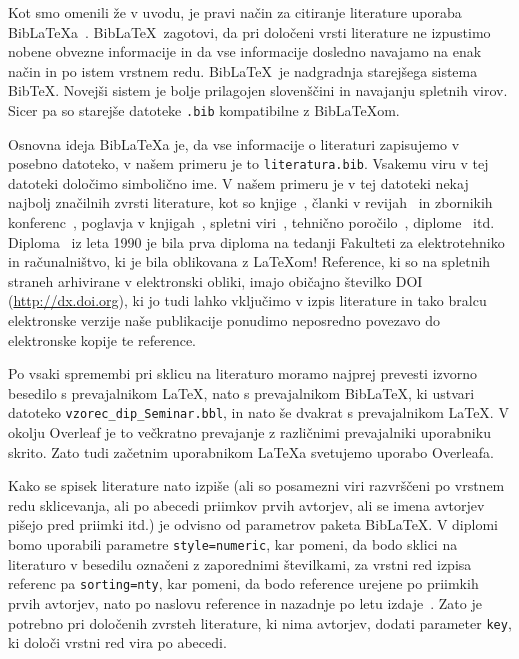 \documentclass[a4paper,12pt,openright]{book}
\newcommand{\BibLaTeX}{{\sc Bib}\LaTeX}
\newcommand{\BibTeX}{{\sc Bib}\TeX}
\begin{document}
    Kot smo omenili že v uvodu, je pravi način za citiranje literature uporaba \BibLaTeX{a}~\cite{biblatex}.
    \BibLaTeX\ zagotovi, da pri določeni vrsti literature ne izpustimo
    nobene obvezne informacije
    in da vse informacije dosledno navajamo na enak način in po istem vrstnem redu.
    \BibLaTeX\ je nadgradnja starejšega sistema \BibTeX. Novejši sistem je bolje prilagojen slovenščini in navajanju spletnih virov. Sicer pa so starejše datoteke \texttt{.bib} kompatibilne z \BibLaTeX om.

    Osnovna ideja \BibLaTeX{a} je, da vse informacije o literaturi zapisujemo v posebno datoteko, v našem primeru je to \texttt{literatura.bib}.
    Vsakemu viru v tej datoteki določimo simbolično ime.
    V našem primeru je v tej datoteki nekaj najbolj značilnih zvrsti literature, kot so knjige~\cite{lamport},
    članki v revijah~\cite{leonardo} in zbornikih konferenc~\cite{ciuha2010visualization},
    poglavja v knjigah~\cite{poglavje_springer},
    spletni viri~\cite{slovarji,video},
    tehnično poročilo~\cite{andersen2012kinect},
    diplome~\cite{diploma} itd.
    Diploma~\cite{diploma} iz leta 1990 je bila prva diploma na tedanji Fakulteti za elektrotehniko in računalništvo, ki je bila oblikovana z \LaTeX om!
    Reference, ki so na spletnih straneh arhivirane v elektronski obliki, imajo običajno  \v stevilko DOI (\url{http://dx.doi.org}), ki jo tudi lahko vključimo v izpis literature in tako bralcu elektronske verzije naše publikacije ponudimo neposredno povezavo do elektronske kopije te reference.

    Po vsaki spremembi pri sklicu na literaturo moramo najprej prevesti izvorno besedilo s prevajalnikom \LaTeX, nato s prevajalnikom  \BibLaTeX, ki ustvari datoteko  {\tt vzorec\_dip\_Seminar.bbl}, in nato še dvakrat s prevajalnikom  \LaTeX.
    V okolju Overleaf je to večkratno prevajanje z različnimi prevajalniki uporabniku skrito. Zato tudi začetnim uporabnikom \LaTeX a svetujemo uporabo Overleafa.

    Kako se spisek literature nato izpiše (ali so posamezni viri razvrščeni po vrstnem redu sklicevanja, ali po abecedi priimkov prvih avtorjev, ali se imena avtorjev pišejo pred priimki itd.) je odvisno od parametrov paketa \BibLaTeX.
    V diplomi bomo uporabili parametre
    \texttt{style=numeric}, kar pomeni, da bodo sklici na literaturo v besedilu označeni z zaporednimi številkami, za vrstni red izpisa referenc pa
    \texttt{sorting=nty}, kar pomeni, da bodo reference urejene po priimkih prvih avtorjev, nato po naslovu reference in nazadnje po letu izdaje~\cite{ctan}.
    Zato je potrebno pri določenih zvrsteh literature, ki nima avtorjev, dodati parameter \texttt{key}, ki določi vrstni red vira po abecedi.
\end{document}
